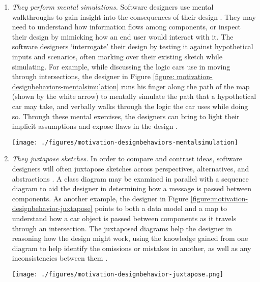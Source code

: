\begin{enumerate}
 \item \emph{They perform mental simulations.} Software designers use mental walkthroughs to gain insight into the consequences of their design \cite{zannier2007model}. They may need to understand how information flows among components, or inspect their design by mimicking how an end user would interact with it. The software designers `interrogate' their design by testing it against hypothetical inputs and scenarios, often marking over their existing sketch while simulating. For example, while discussing the logic cars use in moving through intersections, the designer in Figure \ref{figure: motivation-designbehaviors-mentalsimulation} runs his finger along the path of the map (shown by the white arrow) to mentally simulate the path that a hypothetical car may take, and verbally walks through the logic the car uses while doing so. Through these mental exercises, the designers can bring to light their implicit assumptions and expose flaws in the design \cite{petre2009insights}. 
 

 
 \begin{figure*}[tbh]
  \centering
  \texttt{[image: ./figures/motivation-designbehaviors-mentalsimulation]}
  \caption{Designers sometimes use their sketches to mentally simulate their designs in use.}
  \label{figure: motivation-designbehaviors-mentalsimulation}
\end{figure*} 

 \item \emph{They juxtapose sketches.} In order to compare and contrast ideas, software designers will often juxtapose sketches across perspectives, alternatives, and abstractions \cite{petre2009insights}. A class diagram may be examined in parallel with a sequence diagram to aid the designer in determining how a message is passed between components. As another example, the designer in Figure \ref{figure:motivation-designbehavior-juxtapose} points to both a data model and a map to understand how a car object is passed between components as it travels through an intersection. The juxtaposed diagrams help the designer in reasoning how the design might work, using the knowledge gained from one diagram to help identify the omissions or mistakes in another, as well as any inconsistencies between them \cite{petre2009insights}. 
 
 
\begin{figure*}[tbh]
  \centering
  \texttt{[image: ./figures/motivation-designbehavior-juxtapose.png]}
  \caption{Designers juxtaposing two sketches by pointing.}
  \label{figure:motivation-designbehavior-juxtapose}
\end{figure*} 



\end{enumerate}
